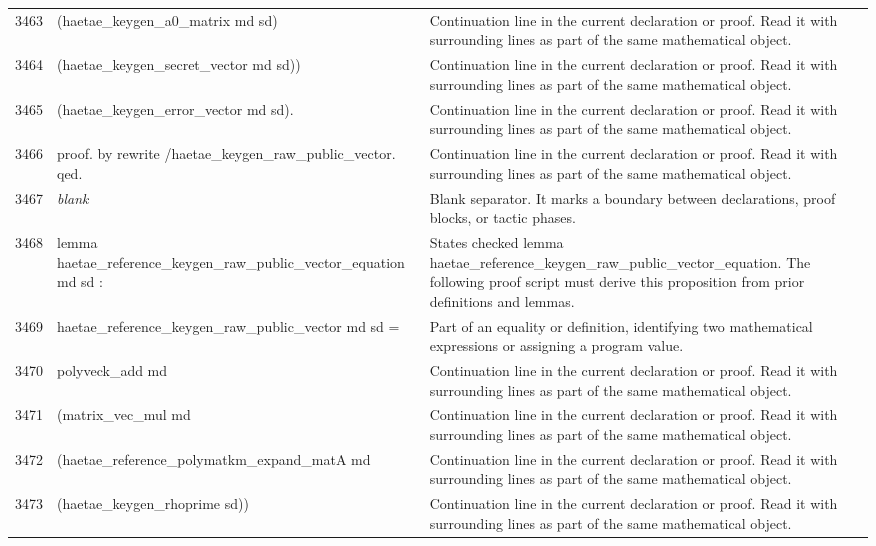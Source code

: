 \documentclass[10pt]{article}
\begin{document}
\begin{longtable}{r L{0.53\textwidth} L{0.37\textwidth}}
3463 & {\ttfamily\scriptsize       (haetae\_keygen\_a0\_matrix md sd)} & Continuation line in the current declaration or proof.  Read it with surrounding lines as part of the same mathematical object. \\
3464 & {\ttfamily\scriptsize       (haetae\_keygen\_secret\_vector md sd))} & Continuation line in the current declaration or proof.  Read it with surrounding lines as part of the same mathematical object. \\
3465 & {\ttfamily\scriptsize     (haetae\_keygen\_error\_vector md sd).} & Continuation line in the current declaration or proof.  Read it with surrounding lines as part of the same mathematical object. \\
3466 & {\ttfamily\scriptsize proof. by rewrite /haetae\_keygen\_raw\_public\_vector. qed.} & Continuation line in the current declaration or proof.  Read it with surrounding lines as part of the same mathematical object. \\
3467 & {\ttfamily\scriptsize \emph{blank}} & Blank separator.  It marks a boundary between declarations, proof blocks, or tactic phases. \\
3468 & {\ttfamily\scriptsize lemma haetae\_reference\_keygen\_raw\_public\_vector\_equation md sd :} & States checked lemma haetae\_reference\_keygen\_raw\_public\_vector\_equation.  The following proof script must derive this proposition from prior definitions and lemmas. \\
3469 & {\ttfamily\scriptsize   haetae\_reference\_keygen\_raw\_public\_vector md sd =} & Part of an equality or definition, identifying two mathematical expressions or assigning a program value. \\
3470 & {\ttfamily\scriptsize   polyveck\_add md} & Continuation line in the current declaration or proof.  Read it with surrounding lines as part of the same mathematical object. \\
3471 & {\ttfamily\scriptsize     (matrix\_vec\_mul md} & Continuation line in the current declaration or proof.  Read it with surrounding lines as part of the same mathematical object. \\
3472 & {\ttfamily\scriptsize       (haetae\_reference\_polymatkm\_expand\_matA md} & Continuation line in the current declaration or proof.  Read it with surrounding lines as part of the same mathematical object. \\
3473 & {\ttfamily\scriptsize         (haetae\_keygen\_rhoprime sd))} & Continuation line in the current declaration or proof.  Read it with surrounding lines as part of the same mathematical object. \\

\end{longtable}
\end{document}
